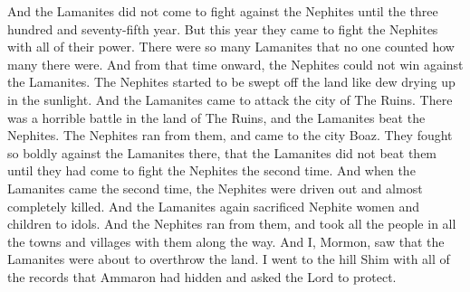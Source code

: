And the Lamanites did not come to fight against the Nephites until the three hundred and seventy-fifth year.
\bverse \iffalse And in this year they did come down against the Nephites with all their powers; and they were not numbered because of the greatness of their number. \fi
But this year they came to fight the Nephites with all of their power. There were so many Lamanites that no one counted how many there were.
\bverse \iffalse And from this time forth did the Nephites gain no power over the Lamanites, but began to be swept off by them even as a dew before the sun. \fi
And from that time onward, the Nephites could not win against the Lamanites. The Nephites started to be swept off the land like dew drying up in the sunlight.
\bverse \iffalse And it came to pass that the Lamanites did come down against the city Desolation; and there was an exceedingly sore battle fought in the land Desolation, in the which they did beat the Nephites. \fi
And the Lamanites came to attack the city of The Ruins. There was a horrible battle in the land of The Ruins, and the Lamanites beat the Nephites.
\bverse \iffalse And they fled again from before them, and they came to the city Boaz; and there they did stand against the Lamanites with exceeding boldness, insomuch that the Lamanites did not beat them until they had come again the second time. \fi
The Nephites ran from them, and came to the city Boaz. They fought so boldly against the Lamanites there, that the Lamanites did not beat them until they had come to fight the Nephites the second time.
\bverse \iffalse And when they had come the second time, the Nephites were driven and slaughtered with an exceedingly great slaughter; their women and their children were again sacrificed unto idols. \fi
And when the Lamanites came the second time, the Nephites were driven out and almost completely killed. And the Lamanites again sacrificed Nephite women and children to idols.
\bverse \iffalse And it came to pass that the Nephites did again flee from before them, taking all the inhabitants with them, both in towns and villages. \fi
And the Nephites ran from them, and took all the people in all the towns and villages with them along the way.
\bverse \iffalse And now I, Mormon, seeing that the Lamanites were about to overthrow the land, therefore I did go to the hill Shim, and did take up all the records which Ammaron had hid up unto the Lord. \fi
And I, Mormon, saw that the Lamanites were about to overthrow the land. I went to the hill Shim with all of the records that Ammaron had hidden and asked the Lord to protect.
